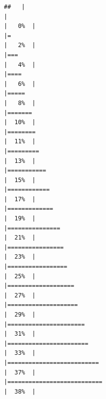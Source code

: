 \documentclass[
]{article}
\begin{document}
\begin{verbatim}
##   |                                                                              |                                                                      |   0%  |                                                                              |=                                                                     |   2%  |                                                                              |===                                                                   |   4%  |                                                                              |====                                                                  |   6%  |                                                                              |=====                                                                 |   8%  |                                                                              |=======                                                               |  10%  |                                                                              |========                                                              |  11%  |                                                                              |=========                                                             |  13%  |                                                                              |===========                                                           |  15%  |                                                                              |============                                                          |  17%  |                                                                              |=============                                                         |  19%  |                                                                              |===============                                                       |  21%  |                                                                              |================                                                      |  23%  |                                                                              |=================                                                     |  25%  |                                                                              |===================                                                   |  27%  |                                                                              |====================                                                  |  29%  |                                                                              |======================                                                |  31%  |                                                                              |=======================                                               |  33%  |                                                                              |==========================                                            |  37%  |                                                                              |===========================                                           |  38%  |                                                                              
\end{verbatim}
\end{document}
